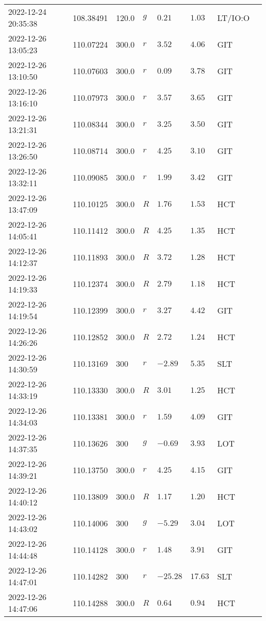 \documentclass{nature_plusfigure}
\begin{document}
\begin{supplement}
\begin{center}
\begin{longtable}{llllllll}
2022-12-24 20:35:38 & 108.38491 & 120.0 & $g$ & $0.21$ & $1.03$ & LT/IO:O &  \\ 
2022-12-26 13:05:23 & 110.07224 & 300.0 & $r$ & $3.52$ & $4.06$ & GIT &  \\ 
2022-12-26 13:10:50 & 110.07603 & 300.0 & $r$ & $0.09$ & $3.78$ & GIT &  \\ 
2022-12-26 13:16:10 & 110.07973 & 300.0 & $r$ & $3.57$ & $3.65$ & GIT &  \\ 
2022-12-26 13:21:31 & 110.08344 & 300.0 & $r$ & $3.25$ & $3.50$ & GIT &  \\ 
2022-12-26 13:26:50 & 110.08714 & 300.0 & $r$ & $4.25$ & $3.10$ & GIT &  \\ 
2022-12-26 13:32:11 & 110.09085 & 300.0 & $r$ & $1.99$ & $3.42$ & GIT &  \\ 
2022-12-26 13:47:09 & 110.10125 & 300.0 & $R$ & $1.76$ & $1.53$ & HCT &  \\ 
2022-12-26 14:05:41 & 110.11412 & 300.0 & $R$ & $4.25$ & $1.35$ & HCT &  \\ 
2022-12-26 14:12:37 & 110.11893 & 300.0 & $R$ & $3.72$ & $1.28$ & HCT &  \\ 
2022-12-26 14:19:33 & 110.12374 & 300.0 & $R$ & $2.79$ & $1.18$ & HCT &  \\ 
2022-12-26 14:19:54 & 110.12399 & 300.0 & $r$ & $3.27$ & $4.42$ & GIT &  \\ 
2022-12-26 14:26:26 & 110.12852 & 300.0 & $R$ & $2.72$ & $1.24$ & HCT &  \\ 
2022-12-26 14:30:59 & 110.13169 & 300 & $r$ & $-2.89$ & $5.35$ & SLT &  \\ 
2022-12-26 14:33:19 & 110.13330 & 300.0 & $R$ & $3.01$ & $1.25$ & HCT &  \\ 
2022-12-26 14:34:03 & 110.13381 & 300.0 & $r$ & $1.59$ & $4.09$ & GIT &  \\ 
2022-12-26 14:37:35 & 110.13626 & 300 & $g$ & $-0.69$ & $3.93$ & LOT &  \\ 
2022-12-26 14:39:21 & 110.13750 & 300.0 & $r$ & $4.25$ & $4.15$ & GIT &  \\ 
2022-12-26 14:40:12 & 110.13809 & 300.0 & $R$ & $1.17$ & $1.20$ & HCT &  \\ 
2022-12-26 14:43:02 & 110.14006 & 300 & $g$ & $-5.29$ & $3.04$ & LOT &  \\ 
2022-12-26 14:44:48 & 110.14128 & 300.0 & $r$ & $1.48$ & $3.91$ & GIT &  \\ 
2022-12-26 14:47:01 & 110.14282 & 300 & $r$ & $-25.28$ & $17.63$ & SLT &  \\ 
2022-12-26 14:47:06 & 110.14288 & 300.0 & $R$ & $0.64$ & $0.94$ & HCT &  \\ 

\end{longtable}
\end{center}
\end{supplement}
\end{document}
